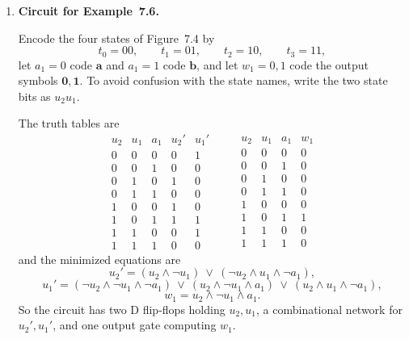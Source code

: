 \begin{enumerate}[{7.}1.]
Let $a_1=0$ code $\pmb{a}$ and $a_1=1$ code $\pmb{b}$; let $t_1=0$ code $s_0$
and $t_1=1$ code $s_1$; and let $w_1=0,1$ code the output symbols
$\pmb{0},\pmb{1}$.  Then
\[
\begin{array}{cc|c}
t_1 & a_1 & t_1'\\
\hline
0&0&0\\
0&1&1\\
1&0&0\\
1&1&1
\end{array}
\qquad
\begin{array}{cc|c}
t_1 & a_1 & w_1\\
\hline
0&0&0\\
0&1&0\\
1&0&1\\
1&1&1
\end{array}
\]
so the minimized equations are
\[
  t_1'=a_1,\qquad w_1=t_1.
\]
Thus the circuit uses one D flip-flop holding $t_1$, the input line $a_1$
feeding the D input, and the present-state line $t_1$ feeding the output line
$w_1$.

\item \textbf{Circuit for Example~7.6.}

Encode the four states of Figure~7.4 by
\[
  t_0=00,\qquad t_1=01,\qquad t_2=10,\qquad t_3=11,
\]
let $a_1=0$ code $\pmb{a}$ and $a_1=1$ code $\pmb{b}$, and let $w_1=0,1$ code
the output symbols $\pmb{0},\pmb{1}$.  To avoid confusion with the state names,
write the two state bits as $u_2u_1$.

The truth tables are
\[
\begin{array}{ccc|cc}
u_2&u_1&a_1&u_2'&u_1'\\
\hline
0&0&0&0&1\\
0&0&1&0&0\\
0&1&0&1&0\\
0&1&1&0&0\\
1&0&0&1&0\\
1&0&1&1&1\\
1&1&0&0&1\\
1&1&1&0&0
\end{array}
\qquad
\begin{array}{ccc|c}
u_2&u_1&a_1&w_1\\
\hline
0&0&0&0\\
0&0&1&0\\
0&1&0&0\\
0&1&1&0\\
1&0&0&0\\
1&0&1&1\\
1&1&0&0\\
1&1&1&0
\end{array}
\]
and the minimized equations are
\[
  u_2'=(u_2\wedge \neg u_1)\ \vee\ (\neg u_2\wedge u_1\wedge \neg a_1),
\]
\[
  u_1'=(\neg u_2\wedge \neg u_1\wedge \neg a_1)\ \vee\
        (u_2\wedge \neg u_1\wedge a_1)\ \vee\
        (u_2\wedge u_1\wedge \neg a_1),
\]
\[
  w_1=u_2\wedge \neg u_1\wedge a_1.
\]
So the circuit has two D flip-flops holding $u_2,u_1$, a combinational network
for $u_2',u_1'$, and one output gate computing $w_1$.


\end{enumerate}
